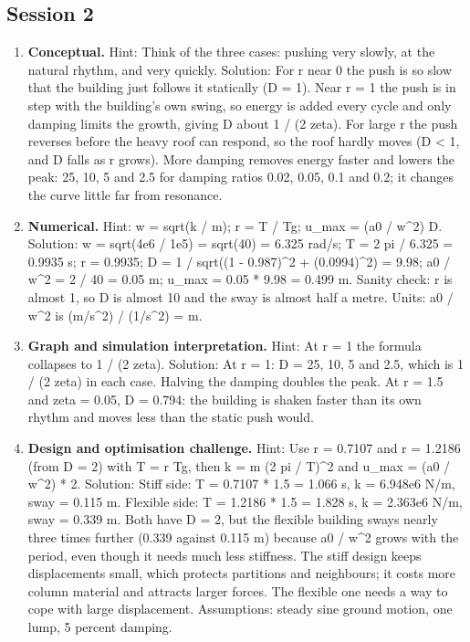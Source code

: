 \documentclass[11pt,a4paper]{article}
\begin{document}
\subsection*{Session 2}
\begin{enumerate}[nosep]
\item \textbf{Conceptual.} Hint: Think of the three cases: pushing very slowly, at the natural rhythm, and very quickly. Solution: For r near 0 the push is so slow that the building just follows it statically (D = 1). Near r = 1 the push is in step with the building's own swing, so energy is added every cycle and only damping limits the growth, giving D about 1 / (2 zeta). For large r the push reverses before the heavy roof can respond, so the roof hardly moves (D \textless{} 1, and D falls as r grows). More damping removes energy faster and lowers the peak: 25, 10, 5 and 2.5 for damping ratios 0.02, 0.05, 0.1 and 0.2; it changes the curve little far from resonance.
\item \textbf{Numerical.} Hint: w = sqrt(k / m); r = T / Tg; u\_max = (a0 / w\textasciicircum{}2) D. Solution: w = sqrt(4e6 / 1e5) = sqrt(40) = 6.325 rad/s; T = 2 pi / 6.325 = 0.9935 s; r = 0.9935; D = 1 / sqrt((1 - 0.987)\textasciicircum{}2 + (0.0994)\textasciicircum{}2) = 9.98; a0 / w\textasciicircum{}2 = 2 / 40 = 0.05 m; u\_max = 0.05 * 9.98 = 0.499 m. Sanity check: r is almost 1, so D is almost 10 and the sway is almost half a metre. Units: a0 / w\textasciicircum{}2 is (m/s\textasciicircum{}2) / (1/s\textasciicircum{}2) = m.
\item \textbf{Graph and simulation interpretation.} Hint: At r = 1 the formula collapses to 1 / (2 zeta). Solution: At r = 1: D = 25, 10, 5 and 2.5, which is 1 / (2 zeta) in each case. Halving the damping doubles the peak. At r = 1.5 and zeta = 0.05, D = 0.794: the building is shaken faster than its own rhythm and moves less than the static push would.
\item \textbf{Design and optimisation challenge.} Hint: Use r = 0.7107 and r = 1.2186 (from D = 2) with T = r Tg, then k = m (2 pi / T)\textasciicircum{}2 and u\_max = (a0 / w\textasciicircum{}2) * 2. Solution: Stiff side: T = 0.7107 * 1.5 = 1.066 s, k = 6.948e6 N/m, sway = 0.115 m. Flexible side: T = 1.2186 * 1.5 = 1.828 s, k = 2.363e6 N/m, sway = 0.339 m. Both have D = 2, but the flexible building sways nearly three times further (0.339 against 0.115 m) because a0 / w\textasciicircum{}2 grows with the period, even though it needs much less stiffness. The stiff design keeps displacements small, which protects partitions and neighbours; it costs more column material and attracts larger forces. The flexible one needs a way to cope with large displacement. Assumptions: steady sine ground motion, one lump, 5 percent damping.
\end{enumerate}
\end{document}
